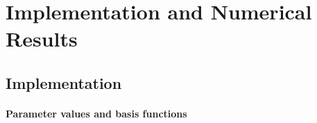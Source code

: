 \section{Implementation and Numerical Results}
\label{sec:84results}


\parbox{1em}{}
\vspace{-3em}



\printornamentsfalse
\subsection{Implementation}
\label{sec:841implementation}
\printornamentstrue

\paragraph{Parameter values and basis functions}

